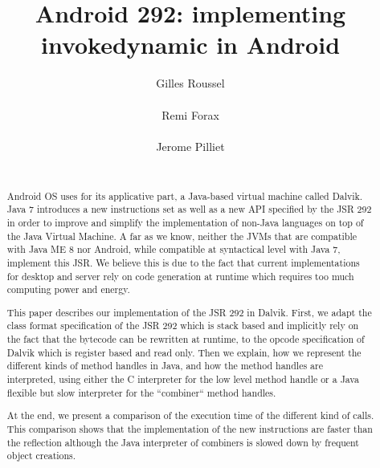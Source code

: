 \documentclass{sig-alternate}
\def \Jsr{JSR\xspace}
\def \JSR{\Jsr 292\xspace}
\begin{document}
\title{Android 292: implementing invokedynamic in Android}

\author{
  \alignauthor Gilles Roussel\\
    \\
  \alignauthor Remi Forax\\
    \\
  \alignauthor Jerome Pilliet\\
    \\
}


\maketitle

\begin{abstract}
Android OS uses for its applicative part, a Java-based virtual machine called Dalvik.
Java 7 introduces a new instructions set as well as a new API  specified by the \JSR
in order to improve and simplify the implementation of non-Java languages on top of the Java Virtual Machine.
A far as we know, neither the JVMs that are compatible with Java ME 8 nor
Android, while compatible at syntactical level with Java 7, implement this \Jsr.
We believe this is due to the fact that current implementations for desktop and server rely
on code generation at runtime which requires too much computing power and energy.

This paper describes our implementation of the \JSR in Dalvik.
First, we adapt the class format specification of the \JSR which is stack based and implicitly rely on the fact that the bytecode
can be rewritten at runtime, to the opcode specification of Dalvik which is register based and read only. 
Then we explain, how we represent the different kinds of method handles in Java, and how the method handles are interpreted,
using either the C interpreter for the low level method handle or a Java flexible but slow interpreter for the ``combiner`` method handles.

At the end, we present a comparison of the execution time of the different kind of calls.
This comparison shows that the implementation of the new instructions are faster than the reflection
although the Java interpreter of combiners is slowed down by frequent object creations.
\end{abstract}
\end{document}
